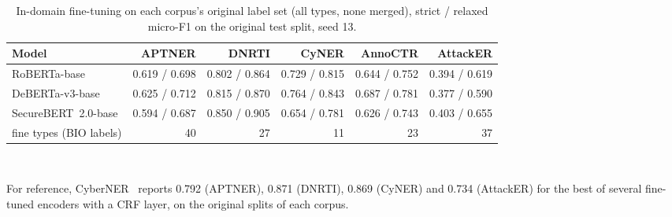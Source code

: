 \begin{table}[t]
\centering
\caption{In-domain fine-tuning on each corpus's original label set (all types, none merged), strict / relaxed micro-F1 on the original test split, seed 13.}
\label{tab:fine}
\small
\begin{adjustbox}{max width=\textwidth}
\begin{tabular}{lrrrrr}
\toprule
Model & APTNER & DNRTI & CyNER & AnnoCTR & AttackER \\
\midrule
RoBERTa-base & 0.619 / 0.698 & 0.802 / 0.864 & 0.729 / 0.815 & 0.644 / 0.752 & 0.394 / 0.619 \\
DeBERTa-v3-base & 0.625 / 0.712 & 0.815 / 0.870 & 0.764 / 0.843 & 0.687 / 0.781 & 0.377 / 0.590 \\
SecureBERT~2.0-base & 0.594 / 0.687 & 0.850 / 0.905 & 0.654 / 0.781 & 0.626 / 0.743 & 0.403 / 0.655 \\
fine types (BIO labels) & 40 & 27 & 11 & 23 & 37 \\
\bottomrule
\end{tabular}
\end{adjustbox}
\\[2pt]\parbox{\textwidth}{\footnotesize For reference, CyberNER~\cite{echchammakhy2025cyberner} reports 0.792 (APTNER), 0.871 (DNRTI), 0.869 (CyNER) and 0.734 (AttackER) for the best of several fine-tuned encoders with a CRF layer, on the original splits of each corpus.}
\end{table}